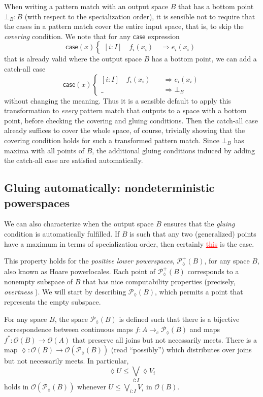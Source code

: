 \documentclass[conference]{IEEEtran}
\newcommand{\PLower}{\mathcal{P}_\lozenge}
\newcommand{\cto}{\to_c}
\newcommand{\Open}[1]{\mathcal{O}({#1})}
\newcommand{\wildcard}{\_}
\newcommand{\Branch}{\Rightarrow}
\newcommand{\iimg}[1]{#1^*}
\newcommand{\grammar}[1]{\textcolor{red}{\underline{#1}}}
\begin{document}
When writing a pattern match with an output space $B$ that has a bottom point $\bot_B : B$ (with respect to the specialization order), it is sensible not to require that the cases in a pattern match cover the entire input space, that is, to skip the \emph{covering} condition. We note that for any $\mathsf{case}$ expression
\[
\mathsf{case}(x)
\begin{cases}
[i : I] \quad f_i(x_i) \quad \Branch e_i(x_i)
\end{cases}
\]
that is already valid where the output space $B$ has a bottom point, we can add a catch-all case
\[
\mathsf{case}(x)
\begin{cases}
[i : I] \quad f_i(x_i) \quad &\Branch e_i(x_i)
\\ \wildcard \quad &\Branch \bot_B
\end{cases}
\]
without changing the meaning. Thus it is a sensible default to apply this transformation to \emph{every} pattern match that outputs to a space with a bottom point, before checking the covering and gluing conditions. Then the catch-all case already suffices to cover the whole space, of course, trivially showing that the covering condition holds for such a transformed pattern match. Since $\bot_B$ has maxima with all points of $B$, the additional gluing conditions induced by adding the catch-all case are satisfied automatically.

\subsection{Gluing automatically: nondeterministic powerspaces}

We can also characterize when the output space $B$ ensures that the \emph{gluing} condition is automatically fulfilled. If $B$ is such that any two (generalized) points have a maximum in terms of specialization order, then certainly \grammar{this} is the case.

This property holds for the \emph{positive lower powerspaces}, $\PLower^+(B)$, for any space $B$, also known as Hoare powerlocales. Each point of $\PLower^+(B)$ corresponds to a nonempty subspace of $B$ that has nice computability properties (precisely, \emph{overtness} \cite{vickersdoublepowerlocale}). We will start by describing $\PLower(B)$, which permits a point that represents the empty subspace. 

For any space $B$, the space $\PLower(B)$ is defined such that there is a bijective correspondence between continuous maps $f : A \cto \PLower(B)$ and maps $\iimg{f} : \Open{B} \to \Open{A}$ that preserve all joins but not necessarily meets. There is a map $\lozenge : \Open{B} \to \Open{\PLower(B)}$ (read ``possibly'') which distributes over joins but not necessarily meets. In particular,
\[
\lozenge U \le \bigvee_{i : I} \lozenge V_i
\]
holds in $\Open{\PLower(B)}$ whenever $U \le \bigvee_{i : I} V_i$ in $\Open{B}$. 
\end{document}
